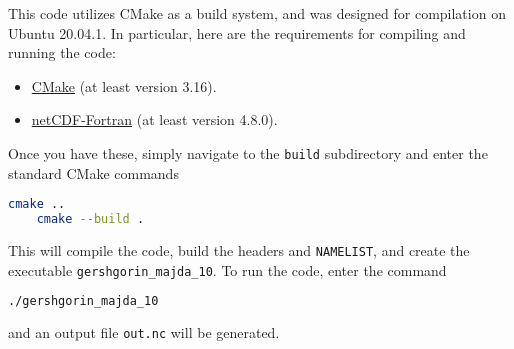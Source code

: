 This code utilizes CMake as a build system, and was designed for compilation on Ubuntu 20.04.1. In particular, here are the requirements for compiling and running the code:
\begin{itemize}
	\item \href{https://gitlab.kitware.com/cmake/cmake}{CMake} (at least version 3.16).
	\item \href{https://github.com/Unidata/netcdf-fortran}{netCDF-Fortran} (at least version 4.8.0).
\end{itemize}

Once you have these, simply navigate to the \texttt{build} subdirectory and enter the standard CMake commands
\begin{lstlisting}[language=bash]
	cmake ..
	cmake --build .
\end{lstlisting}

This will compile the code, build the headers and \texttt{NAMELIST}, and create the executable \texttt{gershgorin\_majda\_10}. To run the code, enter the command
\begin{lstlisting}[language=bash]
	./gershgorin_majda_10
\end{lstlisting}
and an output file \texttt{out.nc} will be generated.
 